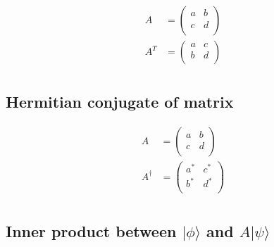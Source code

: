 \documentclass{article}
\begin{document}
\begin{equation}
    \begin{split}
        A & = \begin{pmatrix}
            a & b \\
            c & d \\
        \end{pmatrix} \\
        A^T & = \begin{pmatrix}
            a & c \\
            b & d \\
        \end{pmatrix} \\
    \end{split}
\end{equation}

\subsection{Hermitian conjugate of matrix}

\begin{equation}
    \begin{split}
        A & = \begin{pmatrix}
            a & b \\
            c & d \\
        \end{pmatrix} \\
        A^\dag & = \begin{pmatrix}
            a^* & c^* \\
            b^* & d^* \\
        \end{pmatrix} \\
    \end{split}
\end{equation}

\subsection{Inner product between $|\phi\rangle$ and $A|\psi\rangle$}
\end{document}
